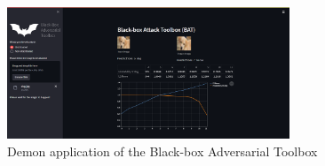 \begin{figure}[H]
\centering
\includegraphics[width=0.75\textwidth]{figures/chapter_classification/bat_app.png}
\caption{Demon application of the Black-box Adversarial Toolbox}
\label{fig.bat_app}
\end{figure}

\clearpage

